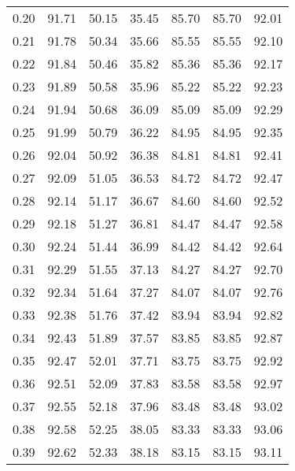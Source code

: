 \begin{tabular}{|c|c|c|c|c|c|c|}
      0.20 &     91.71 &     50.15 &      35.45 &   85.70 &      85.70 &         92.01 \\
      0.21 &     91.78 &     50.34 &      35.66 &   85.55 &      85.55 &         92.10 \\
      0.22 &     91.84 &     50.46 &      35.82 &   85.36 &      85.36 &         92.17 \\
      0.23 &     91.89 &     50.58 &      35.96 &   85.22 &      85.22 &         92.23 \\
      0.24 &     91.94 &     50.68 &      36.09 &   85.09 &      85.09 &         92.29 \\
      0.25 &     91.99 &     50.79 &      36.22 &   84.95 &      84.95 &         92.35 \\
      0.26 &     92.04 &     50.92 &      36.38 &   84.81 &      84.81 &         92.41 \\
      0.27 &     92.09 &     51.05 &      36.53 &   84.72 &      84.72 &         92.47 \\
      0.28 &     92.14 &     51.17 &      36.67 &   84.60 &      84.60 &         92.52 \\
      0.29 &     92.18 &     51.27 &      36.81 &   84.47 &      84.47 &         92.58 \\
      0.30 &     92.24 &     51.44 &      36.99 &   84.42 &      84.42 &         92.64 \\
      0.31 &     92.29 &     51.55 &      37.13 &   84.27 &      84.27 &         92.70 \\
      0.32 &     92.34 &     51.64 &      37.27 &   84.07 &      84.07 &         92.76 \\
      0.33 &     92.38 &     51.76 &      37.42 &   83.94 &      83.94 &         92.82 \\
      0.34 &     92.43 &     51.89 &      37.57 &   83.85 &      83.85 &         92.87 \\
      0.35 &     92.47 &     52.01 &      37.71 &   83.75 &      83.75 &         92.92 \\
      0.36 &     92.51 &     52.09 &      37.83 &   83.58 &      83.58 &         92.97 \\
      0.37 &     92.55 &     52.18 &      37.96 &   83.48 &      83.48 &         93.02 \\
      0.38 &     92.58 &     52.25 &      38.05 &   83.33 &      83.33 &         93.06 \\
      0.39 &     92.62 &     52.33 &      38.18 &   83.15 &      83.15 &         93.11 \\

\end{tabular}
